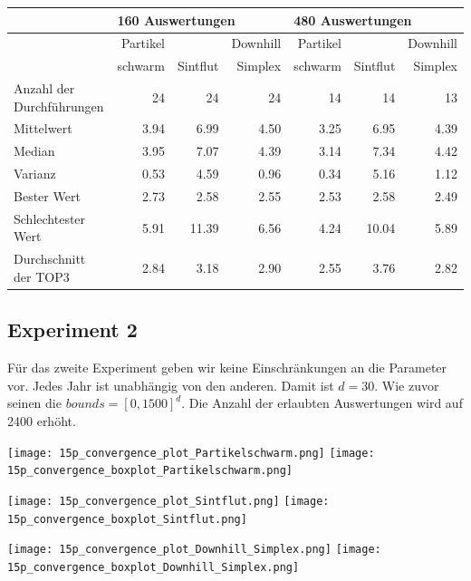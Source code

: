 \documentclass[a4paper,12pt]{article}
\begin{document}
\begin{center}
\begin{tabular}{| l || r | r | r || r | r | r ||}
\hline
        & \multicolumn{3}{l||}{160 Auswertungen} & \multicolumn{3}{l||}{480 Auswertungen} \\ \hline
        & Partikel &          & Downhill & Partikel &          & Downhill\\ 
        & schwarm  & Sintflut & Simplex  & schwarm  & Sintflut & Simplex\\ \hline
Anzahl der Durchführungen  & 24 & 24 & 24 & 14 & 14 & 13 \\ \hline
Mittelwert                 & 3.94 & 6.99 & 4.50 & 3.25 & 6.95 & 4.39 \\ \hline
Median                     & 3.95 & 7.07 & 4.39 & 3.14 & 7.34 & 4.42 \\ \hline
Varianz                    & 0.53 & 4.59 & 0.96 & 0.34 & 5.16 & 1.12 \\ \hline
Bester Wert                & 2.73 & 2.58 & 2.55 & 2.53 & 2.58 & 2.49 \\ \hline
Schlechtester Wert         & 5.91 &11.39 & 6.56 & 4.24 &10.04 & 5.89 \\ \hline
Durchschnitt der TOP3      & 2.84 & 3.18 & 2.90 & 2.55 & 3.76 & 2.82 \\ \hline
\end{tabular}
\end{center}

\subsection{Experiment 2}

Für das zweite Experiment geben wir keine Einschränkungen an die Parameter vor. Jedes Jahr ist unabhängig von den anderen. Damit ist $d = 30$. Wie zuvor seinen die $bounds = [0,1500]^d$. Die Anzahl der erlaubten Auswertungen wird auf 2400 erhöht.

\texttt{[image: 15p\_convergence\_plot\_Partikelschwarm.png]}
\texttt{[image: 15p\_convergence\_boxplot\_Partikelschwarm.png]}


\texttt{[image: 15p\_convergence\_plot\_Sintflut.png]}
\texttt{[image: 15p\_convergence\_boxplot\_Sintflut.png]}

\texttt{[image: 15p\_convergence\_plot\_Downhill\_Simplex.png]}
\texttt{[image: 15p\_convergence\_boxplot\_Downhill\_Simplex.png]}
\end{document}
